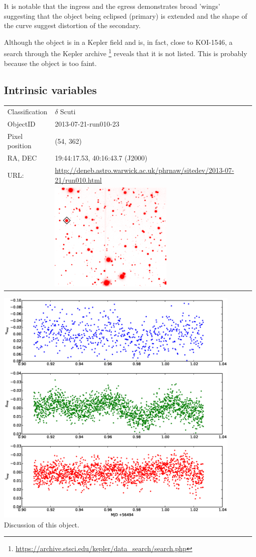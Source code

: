   It is notable that the ingress and the egress demonstrates broad 'wings' suggesting that the object being eclipsed (primary) is extended and the shape of the curve suggest distortion of the secondary.

  Although the object is in a Kepler field and is, in fact, close to KOI-1546, a search through the Kepler archive \footnote{\url{https://archive.stsci.edu/kepler/data_search/search.php}} reveals that it is not listed. This is probably because the object is too faint. 

\newpage
\subsection{Intrinsic variables}

  \begin{tabular}{l l}
  Classification & $\delta$ Scuti \\
  ObjectID & 2013-07-21-run010-23 \\
  Pixel position & (54, 362) \\
  RA, DEC & 19:44:17.53, 40:16:43.7 (J2000) \\
  URL: & \small \url{http://deneb.astro.warwick.ac.uk/phrnaw/sitedev/2013-07-21/run010.html} \\
       & \includegraphics[width=60mm]{images/2013-07-21-run010-23.png} \\
  \end{tabular}
  \includegraphics[width=120mm]{images/2013-07-21-run010-23_lightcurve.eps} \\
  Discussion of this object.


